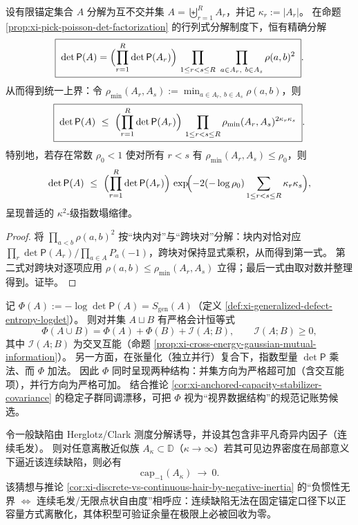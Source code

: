 

\begin{corollary}\label{cor:xi-pick-poisson-det-multipartition-kappa2-collapse}
设有限锚定集合 \(A\) 分解为互不交并集 \(A=\biguplus_{r=1}^{R}A_r\)，并记 \(\kappa_r:=|A_r|\)。
在命题 \ref{prop:xi-pick-poisson-det-factorization} 的行列式分解制度下，恒有精确分解
\[
\boxed{\;
\det\mathsf P(A)
=\Bigl(\prod_{r=1}^{R}\det\mathsf P(A_r)\Bigr)\,
\prod_{1\le r<s\le R}\ \prod_{a\in A_r,\ b\in A_s}\rho(a,b)^{2}\; }.
\]
从而得到统一上界：令
\(
\rho_{\min}(A_r,A_s):=\min_{a\in A_r,\ b\in A_s}\rho(a,b)
\)，则
\[
\boxed{\;
\det\mathsf P(A)\ \le\
\Bigl(\prod_{r=1}^{R}\det\mathsf P(A_r)\Bigr)\,
\prod_{1\le r<s\le R}\rho_{\min}(A_r,A_s)^{2\kappa_r\kappa_s}\; }.
\]
特别地，若存在常数 \(\rho_0<1\) 使对所有 \(r<s\) 有 \(\rho_{\min}(A_r,A_s)\le\rho_0\)，则
\[
\det\mathsf P(A)\ \le\ \Bigl(\prod_{r=1}^{R}\det\mathsf P(A_r)\Bigr)\,
\exp\!\Bigl(-2(-\log\rho_0)\sum_{1\le r<s\le R}\kappa_r\kappa_s\Bigr),
\]
呈现普适的 \(\kappa^2\)-级指数塌缩律。
\end{corollary}
\begin{proof}
将 \(\prod_{a<b}\rho(a,b)^2\) 按“块内对”与“跨块对”分解：块内对恰对应 \(\prod_r\det\mathsf P(A_r)/\prod_{a\in A}P_a(-1)\)，跨块对保持显式乘积，从而得到第一式。
第二式对跨块对逐项应用 \(\rho(a,b)\le \rho_{\min}(A_r,A_s)\) 立得；最后一式由取对数并整理得到。证毕。
\end{proof}

\begin{remark}\label{rem:xi-anchored-capacity-accounting-structures}
记 \(\Phi(A):=-\log\det\mathsf P(A)=S_{\mathrm{gen}}(A)\)（定义 \ref{def:xi-generalized-defect-entropy-logdet}）。
则对并集 \(A\sqcup B\) 有严格会计恒等式
\[
\Phi(A\cup B)=\Phi(A)+\Phi(B)+\mathcal I(A;B),\qquad \mathcal I(A;B)\ge 0,
\]
其中 \(\mathcal I(A;B)\) 为交叉互能（命题 \ref{prop:xi-cross-energy-gaussian-mutual-information}）。
另一方面，在张量化（独立并行）复合下，指数型量 \(\det\mathsf P\) 乘法、而 \(\Phi\) 加法。
因此 \(\Phi\) 同时呈现两种结构：并集方向为严格超可加（含交互能项），并行方向为严格可加。
结合推论 \ref{cor:xi-anchored-capacity-stabilizer-covariance} 的稳定子群同调漂移，可把 \(\Phi\) 视为“视界数据结构”的规范记账势候选。
\end{remark}

\begin{conjecture}\label{conj:xi-continuous-hair-capacity-collapse}
令一般缺陷由 Herglotz/Clark 测度分解诱导，并设其包含非平凡奇异内因子（连续毛发）。
则对任意离散近似族 \(A_\kappa\subset\mathbb D\)（\(\kappa\to\infty\)）若其可见边界密度在局部意义下逼近该连续缺陷，则必有
\[
\mathrm{cap}_{-1}(A_\kappa)\ \longrightarrow\ 0.
\]
该猜想与推论 \ref{cor:xi-discrete-vs-continuous-hair-by-negative-inertia} 的“负惯性无界 \(\Leftrightarrow\) 连续毛发/无限点状自由度”相呼应：连续缺陷无法在固定锚定口径下以正容量方式离散化，其体积型可验证余量在极限上必被回收为零。
\end{conjecture}

\endinput

